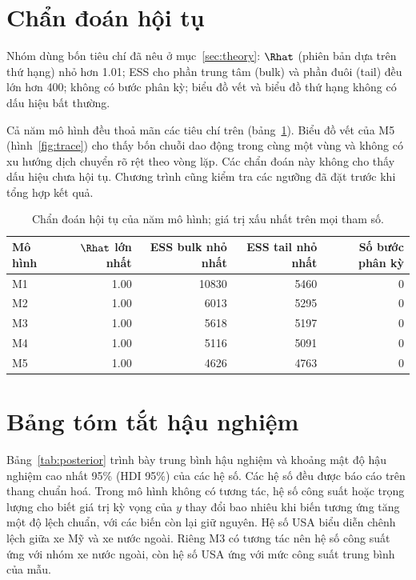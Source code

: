 \documentclass[12pt,a4paper]{report}
\begin{document}

\section{Chẩn đoán hội tụ}

Nhóm dùng bốn tiêu chí đã nêu ở mục~\ref{sec:theory}: $\Rhat$ (phiên bản dựa
trên thứ hạng) nhỏ hơn \num{1.01}; ESS cho phần trung tâm (bulk) và phần đuôi
(tail) đều lớn hơn 400; không có bước phân kỳ; biểu đồ vết và biểu đồ thứ hạng
không có dấu hiệu bất thường.

Cả năm mô hình đều thoả mãn các tiêu chí trên (bảng~\ref{tab:diagnostics}).
Biểu đồ vết của M5 (hình~\ref{fig:trace}) cho thấy bốn chuỗi dao động trong cùng
một vùng và không có xu hướng dịch chuyển rõ rệt theo vòng lặp. Các chẩn đoán
này không cho thấy dấu hiệu chưa hội tụ. Chương trình cũng kiểm tra các ngưỡng
đã đặt trước khi tổng hợp kết quả.

\begin{table}[tp]
  \centering
  \caption{Chẩn đoán hội tụ của năm mô hình; giá trị xấu nhất trên mọi tham
    số.}
  \label{tab:diagnostics}
  \begin{tabular}{lrrrr}
    \toprule
    Mô hình & $\Rhat$ lớn nhất & ESS bulk nhỏ nhất & ESS tail nhỏ nhất & Số bước phân kỳ \\
    \midrule
    M1 & \num{1.00} & \num{10830} & \num{5460} & 0 \\
    M2 & \num{1.00} & \num{6013}  & \num{5295} & 0 \\
    M3 & \num{1.00} & \num{5618}  & \num{5197} & 0 \\
    M4 & \num{1.00} & \num{5116}  & \num{5091} & 0 \\
    M5 & \num{1.00} & \num{4626}  & \num{4763} & 0 \\
    \bottomrule
  \end{tabular}
\end{table}


\section{Bảng tóm tắt hậu nghiệm}
\label{sec:posterior}

Bảng~\ref{tab:posterior} trình bày trung bình hậu nghiệm và khoảng mật độ hậu
nghiệm cao nhất 95\% (HDI 95\%) của các hệ số. Các hệ số đều được báo cáo trên
thang chuẩn hoá. Trong mô hình không có tương tác, hệ số công suất hoặc trọng
lượng cho biết giá trị kỳ vọng của $y$ thay đổi bao nhiêu khi biến tương ứng
tăng một độ lệch chuẩn, với các biến còn lại giữ nguyên. Hệ số USA biểu diễn
chênh lệch giữa xe Mỹ và xe nước ngoài. Riêng M3 có tương tác nên hệ số công
suất ứng với nhóm xe nước ngoài, còn hệ số USA ứng với mức công suất trung
bình của mẫu.
\end{document}
